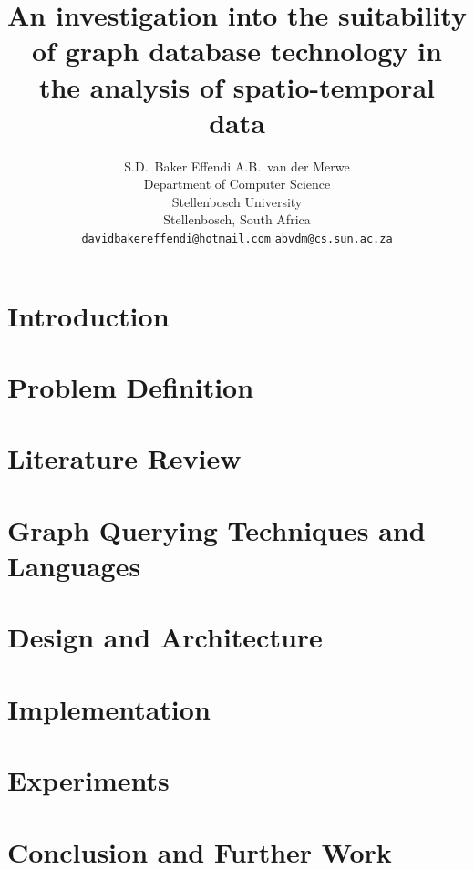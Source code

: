 \documentclass{article}
\title{An investigation into the suitability of graph database technology in the analysis of spatio-temporal data}
\author{
  S.D.~Baker Effendi \qquad  A.B.~van der Merwe \\
  Department of Computer Science\\
  Stellenbosch University\\
  Stellenbosch, South Africa \\
  \texttt{davidbakereffendi@hotmail.com} \qquad \texttt{abvdm@cs.sun.ac.za} \\
}
\begin{document}
\maketitle



\twocolumn

\section{Introduction}

\FloatBarrier

\section{Problem Definition}
\label{sec:prob-def}

\FloatBarrier

\section{Literature Review}
\label{sec:lit-rev}

\FloatBarrier

\section{Graph Querying Techniques and Languages}
\label{sec:graph-lang}

\FloatBarrier

\section{Design and Architecture}
\label{sec:des-arch}

\FloatBarrier

\section{Implementation}
\label{sec:impl}

\FloatBarrier

\section{Experiments}
\label{sec:experiments}

\FloatBarrier

\section{Conclusion and Further Work}
\label{sec:conclusion}

\FloatBarrier

\newpage



\end{document}
